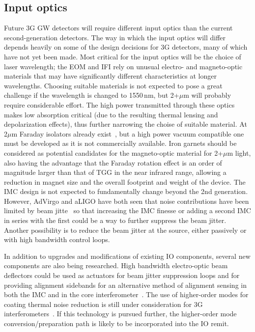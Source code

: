 \subsection{Input optics}
 Future 3G GW detectors will require different input optics than the current second-generation detectors. The way in which the input optics will differ depends heavily on some of the design decisions for 3G detectors, many of which have not yet been made. Most critical for the input optics will be the choice of laser wavelength; the EOM and IFI rely on unusual electro- and magneto-optic materials that may have significantly different characteristics at longer wavelengths. Choosing suitable materials is not expected to pose a great challenge if the wavelength is changed to 1550\,nm, but 2+$\mu$m will probably require considerable effort. The high power transmitted through these optics makes low absorption critical (due to the resulting thermal lensing and depolarization effects), thus further narrowing the choise of suitable material. At 2$\mu$m Faraday isolators already exist~\cite{EOTFI}, but a high power vacuum compatible one must be developed as it is not commercially available. Iron garnets should be considered as potential candidates for the magneto-optic material for 2+$\mu$m light, also having the advantage that the Faraday rotation effect is an order of magnitude larger than that of TGG in the near infrared range, allowing a reduction in magnet size and the overall footprint and weight of the device.
The IMC design is not expected to fundamentally change beyond the 2nd generation.  However, AdVirgo and aLIGO have both seen that noise contributions have been limited by beam jitte~\cite{aLIGOjitter,adVirgojitter} so that increasing the IMC finesse or adding a second IMC in series with the first could be a way to further suppress the beam jitter. Another possibility is to reduce the beam jitter at the source, either passively or with high bandwidth control loops.  

In addition to upgrades and modifications of existing IO components, several new components are also being researched. High bandwidth electro-optic beam deflectors could be used as actuators for beam jitter suppression loops and for providing alignment sidebands for an alternative method of alignment sensing in both the IMC and in the core interferometer~\cite{RFJASC}. The use of higher-order modes for coating thermal noise reduction is still under consideration for 3G interferometers~\cite{LGmodes}. If this technology is pursued further, the higher-order mode conversion/preparation path is likely to be incorporated into the IO remit. 

